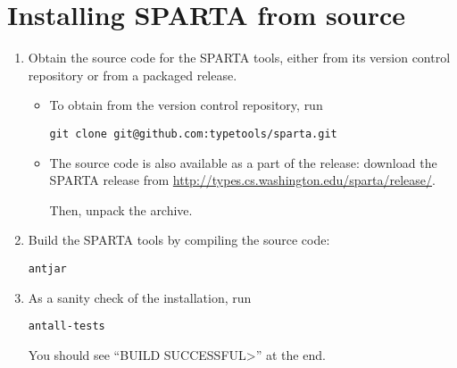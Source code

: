 \section{Installing SPARTA from source\label{install-source}}

\begin{enumerate}

\item
  Obtain the source code for the SPARTA tools, either from its version
  control repository or from a packaged release.

\begin{itemize}
\item
  To obtain from the version control repository, run
\begin{Verbatim}
git clone git@github.com:typetools/sparta.git
\end{Verbatim}
\item

The source code is also available as a part of the release:
  download the SPARTA release from
  \url{http://types.cs.washington.edu/sparta/release/}.

  Then, unpack the archive.
\end{itemize}

%


\item Build the SPARTA tools by compiling the source code:
\begin{alltt}
ant jar
\end{alltt}

\item
As a sanity check of the installation, run

\begin{alltt}
ant all-tests
\end{alltt}

You should see ``\<BUILD SUCCESSFUL>'' at the end.


\end{enumerate}

